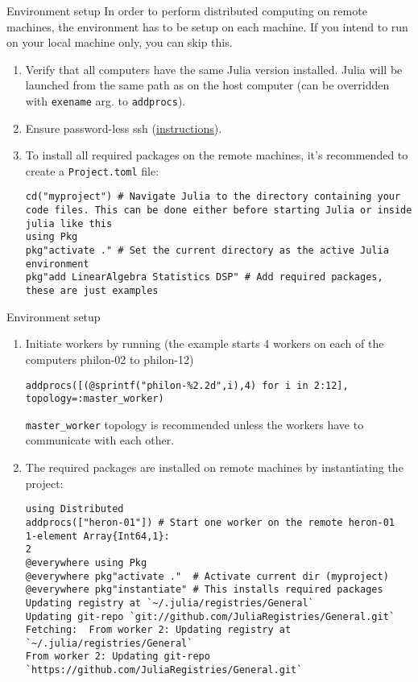 \documentclass{beamer}
\begin{document}
\begin{frame}[fragile]{Environment setup}{}
	In order to perform distributed computing on remote machines, the environment has to be setup on each machine. If you intend to run on your local machine only, you can skip this.
	\begin{enumerate}
		\item Verify that all computers have the same Julia version installed. Julia will be launched from the same path as on the host computer (can be overridden with \texttt{exename} arg. to \texttt{addprocs}).
		\item Ensure password-less ssh (\href{http://www.linuxproblem.org/art_9.html}{instructions}).
		\item To install all required packages on the remote machines, it's recommended to create a \texttt{Project.toml} file:
		\begin{verbatim}
cd("myproject") # Navigate Julia to the directory containing your code files. This can be done either before starting Julia or inside julia like this
using Pkg
pkg"activate ." # Set the current directory as the active Julia environment
pkg"add LinearAlgebra Statistics DSP" # Add required packages, these are just examples
		\end{verbatim}
	\end{enumerate}
\end{frame}

\begin{frame}[fragile]{Environment setup}{}

	\begin{enumerate}

		\item Initiate workers by running (the example starts 4 workers on each of the computers philon-02 to philon-12)
		\begin{verbatim}
addprocs([(@sprintf("philon-%2.2d",i),4) for i in 2:12], topology=:master_worker)
		\end{verbatim}
		\verb+master_worker+ topology is recommended unless the workers have to communicate with each other.
		\item The required packages are installed on remote machines by instantiating the project:
		\begin{verbatim}
using Distributed
addprocs(["heron-01"]) # Start one worker on the remote heron-01
1-element Array{Int64,1}:
2
@everywhere using Pkg
@everywhere pkg"activate ."  # Activate current dir (myproject)
@everywhere pkg"instantiate" # This installs required packages
Updating registry at `~/.julia/registries/General`
Updating git-repo `git://github.com/JuliaRegistries/General.git`
Fetching:  From worker 2: Updating registry at `~/.julia/registries/General`
From worker 2: Updating git-repo `https://github.com/JuliaRegistries/General.git`
\end{verbatim}
\end{enumerate}
\end{frame}
\end{document}
